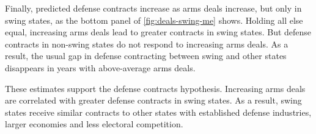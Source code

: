 \documentclass[12pt]{article}
\begin{document}
Finally, predicted defense contracts increase as arms deals increase, but only in swing states, as the bottom panel of \autoref{fig:deals-swing-me} shows. 
Holding all else equal, increasing arms deals lead to greater contracts in swing states. 
But defense contracts in non-swing states do not respond to increasing arms deals.
As a result, the usual gap in defense contracting between swing and other states disappears in years with above-average arms deals. 



These estimates support the defense contracts hypothesis. 
Increasing arms deals are correlated with greater defense contracts in swing states. 
As a result, swing states receive similar contracts to other states with established defense industries, larger economies and less electoral competition. 
%
%
%
%

%
%
\end{document}
